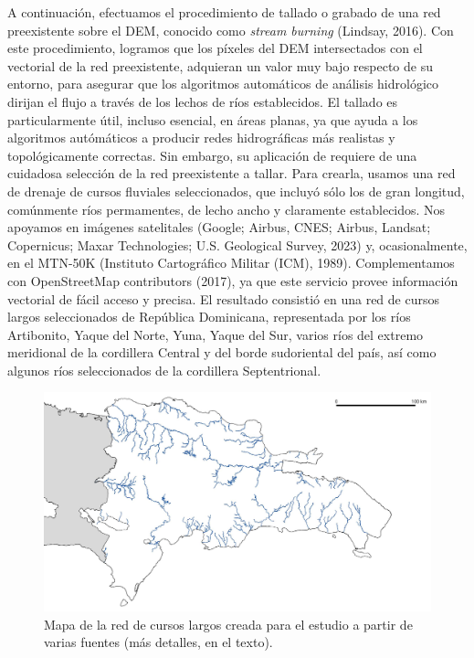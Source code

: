 \documentclass[spanish]{article}
\begin{document}
A continuación, efectuamos el procedimiento de tallado o grabado de una
red preexistente sobre el DEM, conocido como \emph{stream burning}
(Lindsay, 2016). Con este procedimiento, logramos que los píxeles del
DEM intersectados con el vectorial de la red preexistente, adquieran un
valor muy bajo respecto de su entorno, para asegurar que los algoritmos
automáticos de análisis hidrológico dirijan el flujo a través de los
lechos de ríos establecidos. El tallado es particularmente útil, incluso
esencial, en áreas planas, ya que ayuda a los algoritmos autómáticos a
producir redes hidrográficas más realistas y topológicamente correctas.
Sin embargo, su aplicación de requiere de una cuidadosa selección de la
red preexistente a tallar. Para crearla, usamos una red de drenaje de
cursos fluviales seleccionados, que incluyó sólo los de gran longitud,
comúnmente ríos permamentes, de lecho ancho y claramente establecidos.
Nos apoyamos en imágenes satelitales (Google; Airbus, CNES; Airbus,
Landsat; Copernicus; Maxar Technologies; U.S. Geological Survey, 2023)
y, ocasionalmente, en el MTN-50K (Instituto Cartográfico Militar (ICM),
1989). Complementamos con OpenStreetMap contributors (2017), ya que este
servicio provee información vectorial de fácil acceso y precisa. El
resultado consistió en una red de cursos largos seleccionados de
República Dominicana, representada por los ríos Artibonito, Yaque del
Norte, Yuna, Yaque del Sur, varios ríos del extremo meridional de la
cordillera Central y del borde sudoriental del país, así como algunos
ríos seleccionados de la cordillera Septentrional.

\begin{figure}

{\centering \includegraphics[width=1\linewidth]{figuras/red-cursos-largos} 

}

\caption{Mapa de la red de cursos largos creada para el estudio a partir de varias fuentes (más detalles, en el texto).}\label{fig:redcursoslargos}
\end{figure}
\end{document}
